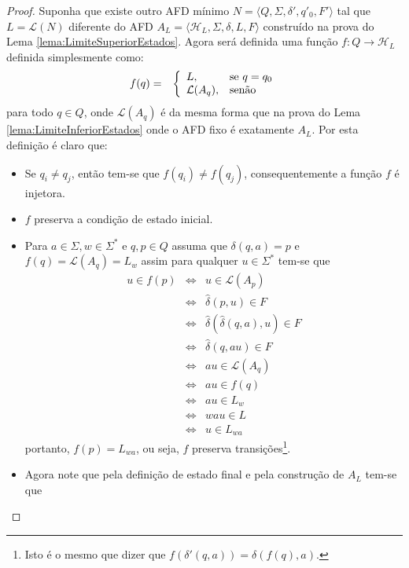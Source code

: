 \begin{proof}
	Suponha que existe outro AFD mínimo $N = \langle Q, \Sigma, \delta', q'_0, F' \rangle$ tal que $L = \mathcal{L}(N)$ diferente do AFD $A_L = \langle \mathcal{H}_L, \Sigma, \delta, L, F \rangle$ construído na prova do Lema \ref{lema:LimiteSuperiorEstados}. Agora será definida uma função $f: Q \rightarrow \mathcal{H}_L$ definida simplesmente como: 
	\begin{eqnarray*}
		f(q) & = & \left\{\begin{array}{ll}	L, & \hbox{se } q = q_0\\	\mathcal{L}(A_q),  & \hbox{senão}\end{array}\right.
	\end{eqnarray*}
	para todo $q \in Q$, onde $\mathcal{L}(A_q)$ é da mesma forma que na prova do Lema \ref{lema:LimiteInferiorEstados} onde o AFD fixo é exatamente $A_L$. Por esta definição é claro que: 
	\begin{itemize}
		\item[(1)] Se $q_i \neq q_j$, então tem-se que $f(q_i) \neq f(q_j)$, consequentemente a função $f$ é injetora.
		\item[(2)] $f$ preserva a condição de estado inicial.
		\item[(3)] Para $a \in \Sigma, w \in \Sigma^*$ e $q, p \in Q$ assuma que $\delta(q, a) = p$ e $f(q) = \mathcal{L}(A_q) = L_w$ assim para qualquer $u \in \Sigma^*$ tem-se que
		\begin{eqnarray*}
			u \in f(p) & \Longleftrightarrow & u \in \mathcal{L}(A_p)\\
			& \Longleftrightarrow &  \widehat{\delta}(p, u) \in F\\
			& \Longleftrightarrow &  \widehat{\delta}(\widehat{\delta}(q, a), u) \in F\\
			& \Longleftrightarrow &  \widehat{\delta}(q, au) \in F\\
			& \Longleftrightarrow &  au \in \mathcal{L}(A_q)\\
			& \Longleftrightarrow &  au \in f(q)\\
			& \Longleftrightarrow &  au \in L_w\\
			& \Longleftrightarrow &  wau \in L\\
			& \Longleftrightarrow &  u \in L_{wa}
		\end{eqnarray*} 
		portanto, $f(p) = L_{wa}$, ou seja, $f$ preserva transições\footnote{Isto é o mesmo que dizer que $f(\delta'(q, a)) = \delta(f(q), a)$.}.
		\item[(4)] Agora note que pela definição de estado final e pela construção de $A_L$ tem-se que 

\end{itemize}
\end{proof}

